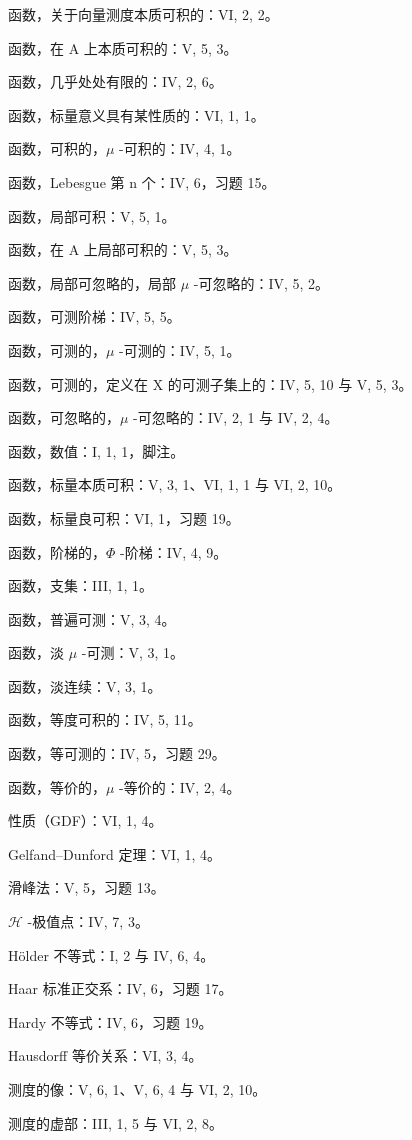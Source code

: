 函数，关于向量测度本质可积的：VI, 2, 2。

函数，在 A 上本质可积的：V, 5, 3。

函数，几乎处处有限的：IV, 2, 6。

函数，标量意义具有某性质的：VI, 1, 1。

函数，可积的，\(\mu\) -可积的：IV, 4, 1。

函数，Lebesgue 第 n 个：IV, 6，习题 15。

函数，局部可积：V, 5, 1。

函数，在 A 上局部可积的：V, 5, 3。

函数，局部可忽略的，局部 \(\mu\) -可忽略的：IV, 5, 2。

函数，可测阶梯：IV, 5, 5。

函数，可测的，\(\mu\) -可测的：IV, 5, 1。

函数，可测的，定义在 X 的可测子集上的：IV, 5, 10 与 V, 5, 3。

函数，可忽略的，\(\mu\) -可忽略的：IV, 2, 1 与 IV, 2, 4。

函数，数值：I, 1, 1，脚注。

函数，标量本质可积：V, 3, 1、VI, 1, 1 与 VI, 2, 10。

函数，标量良可积：VI, 1，习题 19。

函数，阶梯的，\(\Phi\) -阶梯：IV, 4, 9。

函数，支集：III, 1, 1。

函数，普遍可测：V, 3, 4。

函数，淡 \(\mu\) -可测：V, 3, 1。

函数，淡连续：V, 3, 1。

函数，等度可积的：IV, 5, 11。

函数，等可测的：IV, 5，习题 29。

函数，等价的，\(\mu\) -等价的：IV, 2, 4。

性质（GDF）：VI, 1, 4。

Gelfand--Dunford 定理：VI, 1, 4。

滑峰法：V, 5，习题 13。

\(\mathcal{H}\) -极值点：IV, 7, 3。

Hölder 不等式：I, 2 与 IV, 6, 4。

Haar 标准正交系：IV, 6，习题 17。

Hardy 不等式：IV, 6，习题 19。

Hausdorff 等价关系：VI, 3, 4。

测度的像：V, 6, 1、V, 6, 4 与 VI, 2, 10。

测度的虚部：III, 1, 5 与 VI, 2, 8。

